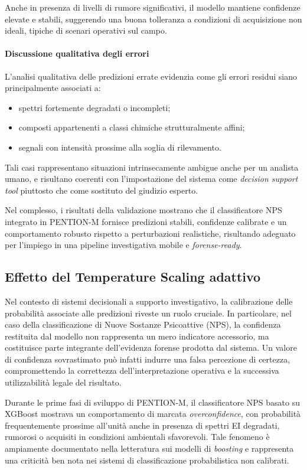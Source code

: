 Anche in presenza di livelli di rumore significativi, il modello mantiene confidenze elevate e stabili, suggerendo una buona tolleranza a condizioni di acquisizione non ideali, tipiche di scenari operativi sul campo.

\paragraph{Discussione qualitativa degli errori}
L’analisi qualitativa delle predizioni errate evidenzia come gli errori residui siano principalmente associati a:
\begin{itemize}
    \item spettri fortemente degradati o incompleti;
    \item composti appartenenti a classi chimiche strutturalmente affini;
    \item segnali con intensità prossime alla soglia di rilevamento.
\end{itemize}

Tali casi rappresentano situazioni intrinsecamente ambigue anche per un analista umano, e risultano coerenti con l’impostazione del sistema come \emph{decision support tool} piuttosto che come sostituto del giudizio esperto.

Nel complesso, i risultati della validazione mostrano che il classificatore NPS integrato in \textsc{PENTION-M} fornisce predizioni stabili, confidenze calibrate e un comportamento robusto rispetto a perturbazioni realistiche, risultando adeguato per l’impiego in una pipeline investigativa mobile e \textit{forense-ready}.

\subsection{Effetto del Temperature Scaling adattivo}
\label{sec:temp_scaling}

Nel contesto di sistemi decisionali a supporto investigativo, la calibrazione delle probabilità associate alle predizioni riveste un ruolo cruciale. In particolare, nel caso della classificazione di Nuove Sostanze Psicoattive (NPS), la confidenza restituita dal modello non rappresenta un mero indicatore accessorio, ma costituisce parte integrante dell’evidenza forense prodotta dal sistema. Un valore di confidenza sovrastimato può infatti indurre una falsa percezione di certezza, compromettendo la correttezza dell’interpretazione operativa e la successiva utilizzabilità legale del risultato.

Durante le prime fasi di sviluppo di \textsc{PENTION-M}, il classificatore NPS basato su XGBoost mostrava un comportamento di marcata \emph{overconfidence}, con probabilità frequentemente prossime all’unità anche in presenza di spettri EI degradati, rumorosi o acquisiti in condizioni ambientali sfavorevoli. Tale fenomeno è ampiamente documentato nella letteratura sui modelli di \textit{boosting} e rappresenta una criticità ben nota nei sistemi di classificazione probabilistica non calibrati.

